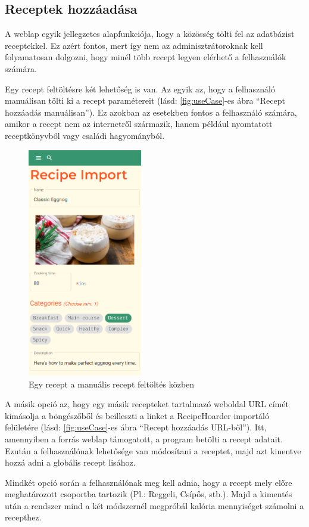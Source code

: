 \documentclass[12pt]{report}
\theoremstyle{definition}
\begin{document}
\subsection{Receptek hozzáadása} 
A weblap egyik jellegzetes alapfunkciója, hogy a közösség tölti fel az adatbázist receptekkel. Ez azért fontos, mert így nem az adminisztrátoroknak kell folyamatosan dolgozni, hogy minél több recept legyen elérhető a felhasználók számára. 

Egy recept feltöltésre két lehetőség is van. Az egyik az, hogy a felhasználó manuálisan tölti ki a recept paramétereit (lásd: \ref{fig:useCase}-es ábra “Recept hozzáadás manuálisan”). Ez azokban az esetekben fontos a felhasználó számára, amikor a recept nem az internetről származik, hanem például nyomtatott receptkönyvből vagy családi hagyományból. 

\begin{figure}[H]%
    \centering
    \includegraphics[width=5cm]{pictures/mobile_importDataCheck.png}
	\caption{Egy recept a manuális recept feltöltés közben}%
    \label{fig:importcheck}%
\end{figure}

A másik opció az, hogy egy másik recepteket tartalmazó weboldal URL címét kimásolja a böngészőből és beilleszti a linket a RecipeHoarder importáló felületére (lásd: \ref{fig:useCase}-es ábra “Recept hozzáadás URL-ből”). Itt, amennyiben a forrás weblap támogatott, a program betölti a recept adatait. Ezután a felhasználónak lehetősége van módosítani a receptet, majd azt kinentve hozzá adni a globális recept lisához.

Mindkét opció során a felhasználónak meg kell adnia, hogy a recept mely előre meghatározott csoportba tartozik (Pl.: Reggeli, Csípős, stb.). Majd a kimentés után a rendszer mind a két módszernél megpróbál kalória mennyiséget számolni a recepthez.
\end{document}
